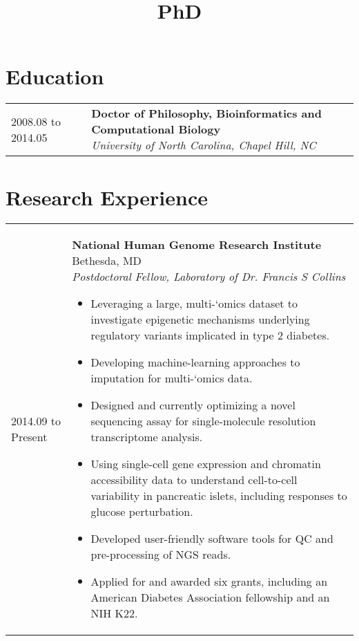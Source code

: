 \documentclass[11pt,letter,sans]{moderncv}
\title{PhD}
\makeatletter
\newenvironment{entrylistThree}{%
  \begin{tabular*}{\textwidth}{@{\extracolsep{\fill}}ll}
}{%
  \end{tabular*}
}
\newcommand{\entryThree}[3]{%
  #1&\parbox[t]{127mm}{%
    \textbf{#2}\\%
    \textit{#3}\vspace{\parsep}%
  }\\}
\newenvironment{entrylistFive}{%
  \begin{tabular*}{\textwidth}{@{\extracolsep{\fill}}ll}
}{%
  \end{tabular*}
}
\newcommand{\entryFive}[5]{%
  #1&\parbox[t]{127mm}{%
    \textbf{#2}%
    \hfill%
    {\footnotesize #3}\\%
	\emph{#4}\\%
    #5\vspace{\parsep}%
  }\\}
\makeatother
\begin{document}
\makecvtitle

\section{Education}
\begin{entrylistThree}
\entryThree
{2008.08 to 2014.05}
{Doctor of Philosophy, Bioinformatics and Computational Biology}
{University of North Carolina, Chapel Hill, NC}
\entryThree
{1996.09 to 2001.06}
{Bachelor of Science, Computer Science}
{Northwestern University, Evanston, IL}
\end{entrylistThree}


\section{Research Experience}
\begin{entrylistFive}
\entryFive
{2014.09 to Present}
{National Human Genome Research Institute}
{Bethesda, MD}
{Postdoctoral Fellow, Laboratory of Dr. Francis S Collins}
{\vspace{-5mm}
\begin{itemize}
\item {Leveraging a large, multi-`omics dataset to investigate epigenetic mechanisms underlying regulatory variants implicated in type 2 diabetes.}
\item {Developing machine-learning approaches to imputation for multi-`omics data.}
\item {Designed and currently optimizing a novel sequencing assay for single-molecule resolution transcriptome analysis.}
\item {Using single-cell gene expression and chromatin accessibility data to understand cell-to-cell variability in pancreatic islets, including responses to glucose perturbation.}
\item {Developed user-friendly software tools for QC and pre-processing of NGS reads.}
\item {Applied for and awarded six grants, including an American Diabetes Association fellowship and an NIH K22.}
\end{itemize}
}
\entryFive
{2009.05 to 2014.08}
{University of North Carolina at Chapel Hill}
{Chapel Hill, NC}
{Research Assistant, Laboratory of Dr. Fernando Pardo-Manuel de Villena}
{\vspace{-5mm}
\begin{itemize}
\item {Characterized the genetic determinants of two meiotic drive systems in the mouse. First, conducted a GWAS of wild mice to identify genes associated with the accumulation of Robertsonian translocations. Second, mapped a novel meiotic drive locus, *R2d2*, and multiple modifier loci responsible for extreme transmission distortion in the Collaborative Cross.}

\end{itemize}}
\end{entrylistFive}
\end{document}
